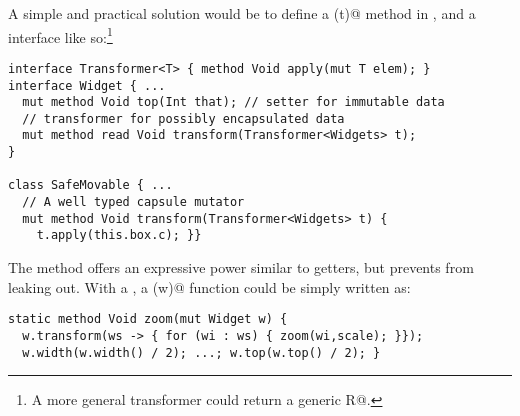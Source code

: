 A simple and practical solution would be to define a \Q@transform(t)@ method in \Q@Widget@, and a \Q@Transformer@ interface 
like so:\footnote{A more general transformer could return a generic \Q@read R@.}
\begin{lstlisting}[escapechar=\%]
interface Transformer<T> { method Void apply(mut T elem); }
interface Widget { ...
  mut method Void top(Int that); // setter for immutable data
  // transformer for possibly encapsulated data
  mut method read Void transform(Transformer<Widgets> t);
}

class SafeMovable { ...
  // A well typed capsule mutator
  mut method Void transform(Transformer<Widgets> t) {
    t.apply(this.box.c); }}
\end{lstlisting}
The \Q@transform@ method offers an expressive power similar to \Q@mut@ getters, but prevents \Q@Widgets@ from leaking out.  With a \Q@Transformer@, a \Q@zoom(w)@ function could be simply written as:
\begin{lstlisting}
static method Void zoom(mut Widget w) {
  w.transform(ws -> { for (wi : ws) { zoom(wi,scale); }});
  w.width(w.width() / 2); ...; w.top(w.top() / 2); }
\end{lstlisting}





